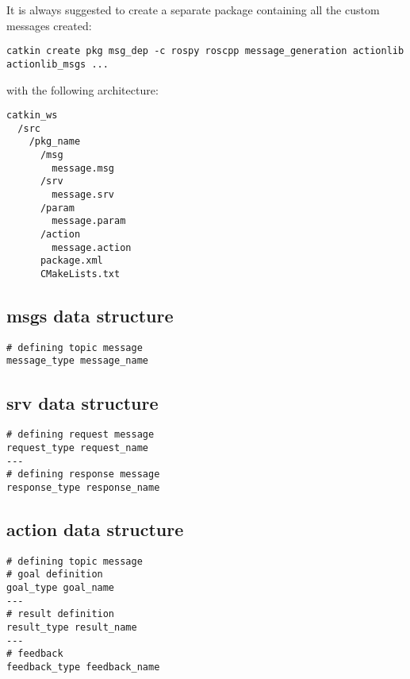         It is always suggested to create a separate package containing all the custom messages created:

\begin{verbatim}
catkin create pkg msg_dep -c rospy roscpp message_generation actionlib actionlib_msgs ...
\end{verbatim}
        with the following architecture:
\begin{verbatim}
catkin_ws
  /src
    /pkg_name
      /msg
        message.msg
      /srv
        message.srv
      /param
        message.param
      /action
        message.action
      package.xml
      CMakeLists.txt
\end{verbatim}
        
        
        \subsection{msgs data structure}
\begin{verbatim}
# defining topic message
message_type message_name
\end{verbatim}
        
        \subsection{srv data structure}
\begin{verbatim}
# defining request message
request_type request_name
---
# defining response message
response_type response_name
\end{verbatim}

        \subsection{action data structure}
\begin{verbatim}
# defining topic message
# goal definition
goal_type goal_name
---
# result definition
result_type result_name
---
# feedback
feedback_type feedback_name
\end{verbatim}
        

